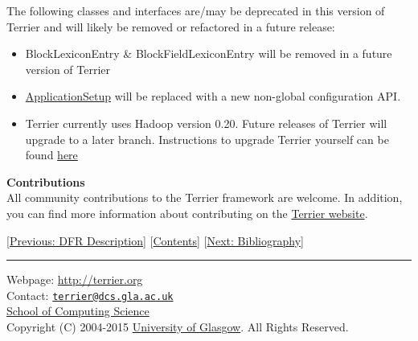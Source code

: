 The following classes and interfaces are/may be deprecated in this
version of Terrier and will likely be removed or refactored in a future
release:

\begin{itemize}
\tightlist
\item
  BlockLexiconEntry \& BlockFieldLexiconEntry will be removed in a
  future version of Terrier
\item
  \href{javadoc/org/terrier/utility/ApplicationSetup.html}{ApplicationSetup}
  will be replaced with a new non-global configuration API.
\item
  Terrier currently uses Hadoop version 0.20. Future releases of Terrier
  will upgrade to a later branch. Instructions to upgrade Terrier
  yourself can be found
  \href{http://ir.dcs.gla.ac.uk/wiki/Terrier/UpgradingHadoop}{here}
\end{itemize}

\textbf{Contributions}\\

All community contributions to the Terrier framework are welcome. In
addition, you can find more information about contributing on the
\href{http://terrier.org/}{Terrier website}.

{[}\href{dfr_description.html}{Previous: DFR Description}{]}
{[}\href{index.html}{Contents}{]} {[}\href{bibliography.html}{Next:
Bibliography}{]}

\begin{center}\rule{0.5\linewidth}{\linethickness}\end{center}

Webpage: \url{http://terrier.org}\\
Contact:
\href{mailto:terrier@dcs.gla.ac.uk}{\nolinkurl{terrier@dcs.gla.ac.uk}}\\
\href{http://www.dcs.gla.ac.uk/}{School of Computing Science}\\
Copyright (C) 2004-2015 \href{http://www.gla.ac.uk/}{University of
Glasgow}. All Rights Reserved.
